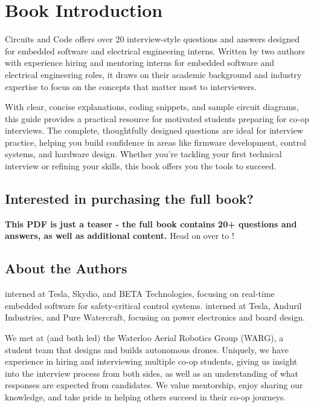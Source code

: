\documentclass[main.tex]{subfiles}
\begin{document}
\section{Book Introduction}
Circuits and Code offers over 20 interview-style questions and answers designed for embedded software and electrical engineering interns. Written by two authors with experience hiring and mentoring interns for embedded software and electrical engineering roles, it draws on their academic background and industry expertise to focus on the concepts that matter most to interviewers. \newline

\newnoindentpara With clear, concise explanations, coding snippets, and sample circuit diagrams, this guide provides a practical resource for motivated students preparing for co-op interviews. The complete, thoughtfully designed questions are ideal for interview practice, helping you build confidence in areas like firmware development, control systems, and hardware design. Whether you’re tackling your first technical interview or refining your skills, this book offers you the tools to succeed.

\subsection{Interested in purchasing the full book?}
\textbf{This PDF is just a teaser - the full book contains 20+ questions and answers, as well as additional content.} Head on over to !

\subsection{About the Authors}
 interned at Tesla, Skydio, and BETA Technologies, focusing on real-time embedded software for safety-critical control systems.
\newline
\newline
{} interned at Tesla, Anduril Industries, and Pure Watercraft, focusing on power electronics and board design. \newline

\newnoindentpara We met at (and both led) the Waterloo Aerial Robotics Group (WARG), a student team that designs and builds autonomous drones. Uniquely, we have experience in hiring and interviewing multiple co-op students, giving us insight into the interview process from both sides, as well as an understanding of what responses are expected from candidates. We value mentorship, enjoy sharing our knowledge, and take pride in helping others succeed in their co-op journeys.
\end{document}
